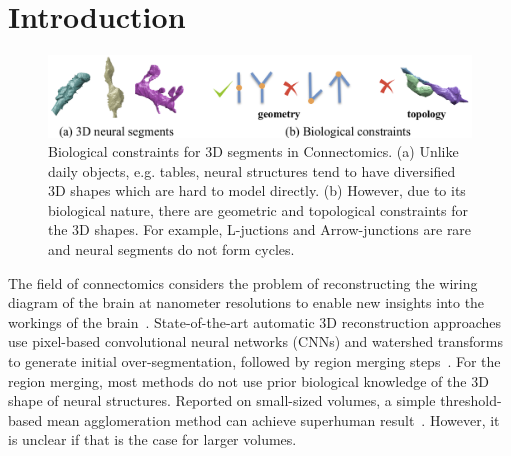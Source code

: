 \section{Introduction}

\begin{figure}[t]
	\centering
	\includegraphics[width=\linewidth]{./figures/bc/teaser_bc_v3.png}
	\caption{Biological constraints for 3D segments in Connectomics. (a) Unlike daily objects, e.g. tables, neural structures tend to have diversified 3D shapes which are hard to model directly. (b) However, due to its biological nature, there are geometric and topological constraints for the 3D shapes. For example, L-juctions and Arrow-junctions are rare and neural segments do not form cycles.}
	\label{fig:biological_constraints}
\end{figure}


The field of connectomics considers the problem of reconstructing the wiring diagram of the brain at nanometer resolutions to enable new insights into the workings of the brain~\cite{haehn2017scalable,kasthuri2015saturated}. 
State-of-the-art automatic 3D reconstruction approaches use pixel-based convolutional neural networks (CNNs) and watershed transforms to generate initial over-segmentation, followed by region merging steps~\cite{seymour2016rhoananet,lee2015recursive,nunez2014graph,parag2017anisotropic,ronneberger2015u,zlateski2015image}.
For the region merging, most methods do not use prior biological knowledge of the 3D shape of neural structures.
Reported on small-sized volumes, a simple threshold-based mean agglomeration method can achieve superhuman result~\cite{lee2017superhuman}.
However, it is unclear if that is the case for larger volumes.

